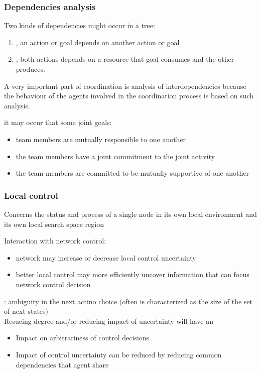 \subsubsection{Dependencies analysis}
Two kinds of dependencies might occur in a tree:
\begin{enumerate}
\item {}, an action or goal depends on another action or goal
\item {}, both actions depends on a resource that goal consumes and the other produces.
\end{enumerate}
A very important part of coordination is analysis of interdependencies because the behaviour of the agents involved in the coordination process is based on such analysis.

it may occur that some joint goals:
\begin{itemize}
\item team members are mutually responsible to one another
\item the team members have a joint commitment to the joint activity
\item the team members are committed to be mutually supportive of one another
\end{itemize}

\subsubsection{Local control}
Concerns the status and process of a single node in its own local environment and its own local  search space region

Interaction with network control:
\begin{itemize}
\item network may increase or decrease local control uncertainty
\item better local control may more efficiently uncover information that can focus network control decision
\end{itemize}

: ambiguity in the next actino choice (often is characterized as the size of the set of next-states)\\
Resucing degree and/or reducing impact of uncertainty will have an
\begin{itemize}
\item Impact on arbitrariness of control decisions
\item Impact of control uncertainty can be reduced by reducing common dependencies that agent share
\end{itemize}

